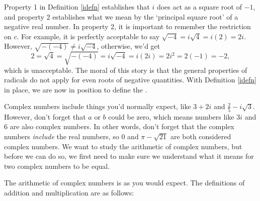 
Property 1 in Definition \ref{idefn} establishes that $i$ does act as a square root of $-1$, and property 2 establishes what we mean by the `principal square root' of a negative real number.  In property 2, it is important to remember the restriction on $c$.  For example, it is perfectly acceptable to say  $\sqrt{-4} = i \sqrt{4} = i(2) = 2i$. However, $\sqrt{-(-4)} \neq i \sqrt{-4}$, otherwise, we'd get\[ 2 = \sqrt{4} = \sqrt{-(-4)} = i \sqrt{-4} = i (2i) = 2i^2 = 2(-1) = -2,\] which is unacceptable. The moral of this story is that the general properties of radicals do not apply for even roots of negative quantities.  With Definition \ref{idefn} in place, we are now in position to define the .

\medskip


\medskip

Complex numbers include things you'd normally expect, like $3+2i$ and $\frac{2}{5} - i\sqrt{3}$.  However, don't forget that $a$ or $b$ could be zero, which means numbers like $3i$ and $6$ are also complex numbers.  In other words, don't forget that the complex numbers \textit{include} the real numbers, so $0$ and $\pi - \sqrt{21}$ are both considered complex numbers. We want to study the arithmetic of complex numbers, but before we can do so, we first need to make sure we understand what it means for two complex numbers to be equal.

\smallskip


\smallskip

The arithmetic of complex numbers is as you would expect. The definitions of addition and multiplication are as follows:

